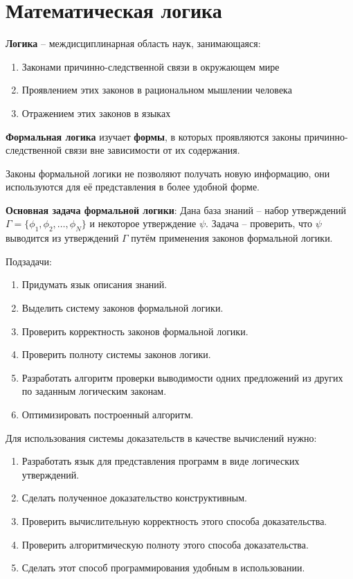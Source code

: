 \documentclass[11pt]{article}
\author{Sergey Makarov}
\date{\today}
\title{}
\begin{document}
\tableofcontents


\section{Математическая логика}
\label{sec:org986e0c9}
\textbf{Логика} -- междисциплинарная область наук, занимающаяся:
\begin{enumerate}
\item Законами причинно-следственной связи в окружающем мире
\item Проявлением этих законов в рациональном мышлении человека
\item Отражением этих законов в языках
\end{enumerate}
\textbf{Формальная логика} изучает \textbf{формы}, в которых проявляются законы причинно-следственной связи вне зависимости от их содержания.

Законы формальной логики не позволяют получать новую информацию, они используются для её представления в более удобной форме.

\textbf{Основная задача формальной логики}:
Дана база знаний -- набор утверждений \(\Gamma = \{\phi_1, \phi_2, \ldots, \phi_N\}\) и некоторое утверждение \(\psi\). Задача -- проверить, что \(\psi\) выводится из утверждений \(\Gamma\) путём применения законов формальной логики.

Подзадачи:
\begin{enumerate}
\item Придумать язык описания знаний.
\item Выделить систему законов формальной логики.
\item Проверить корректность законов формальной логики.
\item Проверить полноту системы законов логики.
\item Разработать алгоритм проверки выводимости одних предложений из других по заданным логическим законам.
\item Оптимизировать построенный алгоритм.
\end{enumerate}

Для использования системы доказательств в качестве вычислений нужно:
\begin{enumerate}
\item Разработать язык для представления программ в виде логических утверждений.
\item Сделать полученное доказательство конструктивным.
\item Проверить вычислительную корректность этого способа доказательства.
\item Проверить алгоритмическую полноту этого способа доказательства.
\item Сделать этот способ программирования удобным в использовании.
\end{enumerate}
\end{document}
